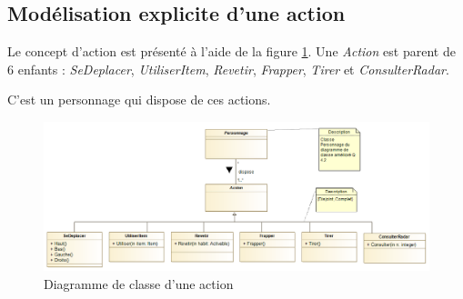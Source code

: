 
\subsection{Modélisation explicite d'une action}
\label{sec:question11}

Le concept d'action est présenté à l'aide de la figure \ref{fig:action}. Une \emph{Action} est parent de 6 enfants : \emph{SeDeplacer}, \emph{UtiliserItem}, \emph{Revetir}, \emph{Frapper}, \emph{Tirer} et \emph{ConsulterRadar}.

C'est un personnage qui dispose de ces actions.

\begin{figure}
	\centering
	\includegraphics[width=500pt]{assets/class__Action}
	\caption{Diagramme de classe d'une action}
	\label{fig:action}
\end{figure}